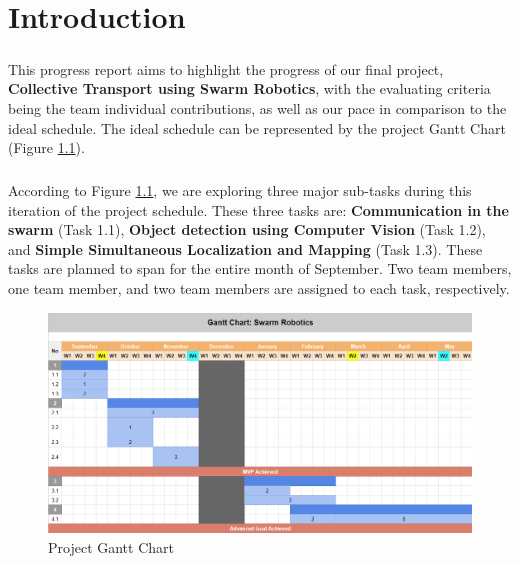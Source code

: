 \chapter{Introduction}

\paragraph*{}
This progress report aims to highlight the progress of our final project, \textbf{Collective Transport using Swarm Robotics}, with the evaluating criteria being the team individual contributions, as well as our pace in comparison to the ideal schedule. The ideal schedule can be represented by the project Gantt Chart (Figure \ref{fig:gantt_chart}).

\paragraph*{}
According to Figure \ref{fig:gantt_chart}, we are exploring three major sub-tasks during this iteration of the project schedule. These three tasks are: \textbf{Communication in the swarm} (Task 1.1), \textbf{Object detection using Computer Vision} (Task 1.2), and \textbf{Simple Simultaneous Localization and Mapping} (Task 1.3). These tasks are planned to span for the entire month of September. Two team members, one team member, and two team members are assigned to each task, respectively.

\begin{figure}[H]
    \centering
    \includegraphics[width=1\linewidth]{progress_report_1/assets/images/introduction/gantt_chart.png}
    \caption{Project Gantt Chart}
    \label{fig:gantt_chart}
\end{figure}
